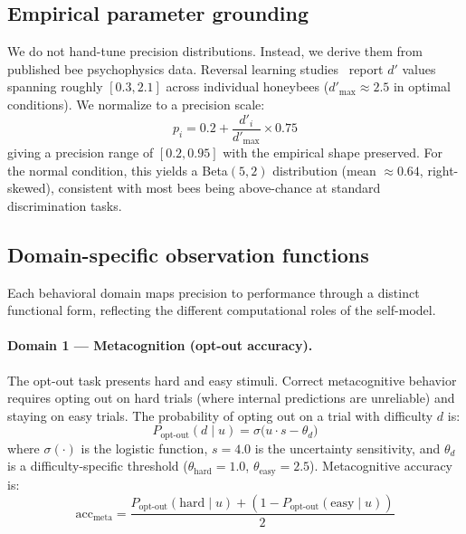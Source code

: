 \documentclass[12pt]{article}
\newcommand{\precision}{p}
\newcommand{\uncertainty}{u}
\newcommand{\optout}{\text{opt-out}}
\newcommand{\poptout}{P_{\optout}}
\newcommand{\metaacc}{\text{acc}_{\text{meta}}}
\newcommand{\sigmoid}{\sigma}
\newcommand{\thresh}[1]{\theta_{#1}}
\newcommand{\slope}{s}
\begin{document}
\subsection*{Empirical parameter grounding}

We do not hand-tune precision distributions. Instead, we derive them from published bee
psychophysics data. Reversal learning studies~\cite{AvarWeber2012} report $d'$ values spanning
roughly $[0.3, 2.1]$ across individual honeybees ($d'_{\max} \approx 2.5$ in optimal conditions).
We normalize to a precision scale:
\begin{equation}
  \precision_i = 0.2 + \frac{d'_i}{d'_{\max}} \times 0.75
\end{equation}
giving a precision range of $[0.2, 0.95]$ with the empirical shape preserved. For the normal
condition, this yields a Beta$(5, 2)$ distribution (mean $\approx 0.64$, right-skewed), consistent
with most bees being above-chance at standard discrimination tasks.

\subsection*{Domain-specific observation functions}

Each behavioral domain maps precision to performance through a distinct functional form, reflecting
the different computational roles of the self-model.

\paragraph{Domain 1 --- Metacognition (opt-out accuracy).}
The opt-out task presents hard and easy stimuli. Correct metacognitive behavior requires opting out
on hard trials (where internal predictions are unreliable) and staying on easy trials. The
probability of opting out on a trial with difficulty $d$ is:
\begin{equation}
  \poptout(d \mid \uncertainty) = \sigmoid\!\bigl(\uncertainty \cdot \slope - \thresh{d}\bigr)
\end{equation}
where $\sigmoid(\cdot)$ is the logistic function, $\slope = 4.0$ is the uncertainty sensitivity,
and $\thresh{d}$ is a difficulty-specific threshold ($\thresh{\text{hard}} = 1.0$,
$\thresh{\text{easy}} = 2.5$). Metacognitive accuracy is:
\begin{equation}
  \metaacc = \frac{\poptout(\text{hard} \mid \uncertainty) + (1 - \poptout(\text{easy} \mid \uncertainty))}{2}
  \label{eq:meta}
\end{equation}
\end{document}
